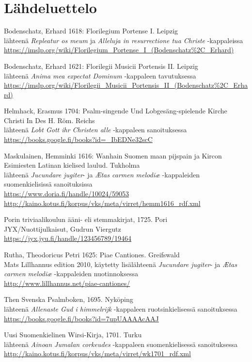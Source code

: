 \chapter*{Lähdeluettelo}

Bodenschatz, Erhard 1618: Florilegium Portense I. Leipzig \\
lähteenä \emph{Repleatur os meum} ja \emph{Alleluja in resurrectione tua Christe} -kappaleissa \\
\url{https://imslp.org/wiki/Florilegium\_Portense\_I\_(Bodenschatz%2C\_Erhard)}

Bodenschatz, Erhard 1621: Florilegii Musicii Portensis II. Leipzig \\
lähteenä \emph{Anima mea expectat Dominum} -kappaleen tavutuksessa \\
\url{https://imslp.org/wiki/Florilegii\_Musicii\_Portensis\_II\_(Bodenschatz%2C\_Erhard)}

Helmhack, Erasmus 1704: Psalm-singende Und Lobgesäng-spielende Kirche Christi In Des H. Röm. Reichs \\
lähteenä \emph{Lobt Gott ihr Christen alle} -kappaleen sanoituksessa \\
\url{https://books.google.fi/books?id=\_IbEDNe32scC}

Maskulainen, Hemminki 1616: Wanhain Suomen maan pijspain ja Kircon Esimiesten Latinan kielised laulud. Tukholma \\
lähteenä \emph{Jucundare jugiter}- ja \emph{Ætas carmen melodiæ} -kappaleiden suomenkielisissä sanoituksissa \\
\url{https://www.doria.fi/handle/10024/59053} \\
\url{http://kaino.kotus.fi/korpus/vks/meta/virret/hemm1616_rdf.xml}

Porin triviaalikoulun ääni- eli stemmakirjat, 1725. Pori \\
JYX/Nuottijulkaisut, Gudrun Viergutz \\
\url{https://jyx.jyu.fi/handle/123456789/19464}

Rutha, Theodoricus Petri 1625: Piae Cantiones. Greifswald \\
Mats Lillhannus edition 2010, käytetty lisälähteenä \emph{Jucundare jugiter}- ja \emph{Ætas carmen melodiæ} -kappaleiden nuotinnoksessa \\
\url{http://www.lillhannus.net/piae-cantiones/}

Then Svenska Psalmboken, 1695. Nyköping \\
lähteenä \emph{Allenaste Gud i himmelrijk} -kappaleen ruotsinkielisessä sanoituksessa \\
\url{https://books.google.fi/books?id=7upUAAAAcAAJ}

Uusi Suomenkielinen Wirsi-Kirja, 1701. Turku \\
lähteenä \emph{Ainoan Jumalan corkeudes} -kappaleen suomenkielisessä sanoituksessa \\
\url{http://kaino.kotus.fi/korpus/vks/meta/virret/wk1701_rdf.xml}
